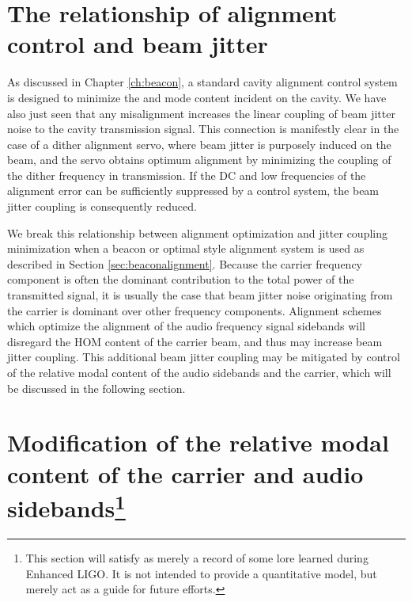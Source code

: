 \section{The relationship of alignment control and beam jitter}
As discussed in Chapter \ref{ch:beacon}, a standard cavity alignment control system is designed to minimize the  and  mode content incident on the cavity. %
We have also just seen that any misalignment increases the linear coupling of beam jitter noise to the cavity transmission signal. %
This connection is manifestly clear in the case of a dither alignment servo, where beam jitter is purposely induced on the beam, and the servo obtains optimum alignment by minimizing the coupling of the dither frequency in transmission. %
If the DC and low frequencies of the alignment error can be sufficiently suppressed by a control system, the beam jitter coupling is consequently reduced.


We break this relationship between alignment optimization and jitter coupling minimization when a beacon or optimal style alignment system is used as described in Section \ref{sec:beaconalignment}. %
Because the carrier frequency component is often the dominant contribution to the total power of the transmitted signal, it is usually the case that beam jitter noise originating from the carrier is dominant over other frequency components. %
Alignment schemes which optimize the alignment of the audio frequency signal sidebands will disregard the HOM content of the carrier beam, and thus may increase beam jitter coupling. %
This additional beam jitter coupling may be mitigated by control of the relative modal content of the audio sidebands and the carrier, which will be discussed in the following section.

\section[Modification of the relative modal content of the carrier and audio sidebands]{Modification of the relative modal content of the carrier and audio sidebands\footnote{This section will satisfy as merely a record of some lore learned during Enhanced LIGO. It is not intended to provide a quantitative model, but merely act as a guide for future efforts.}}

